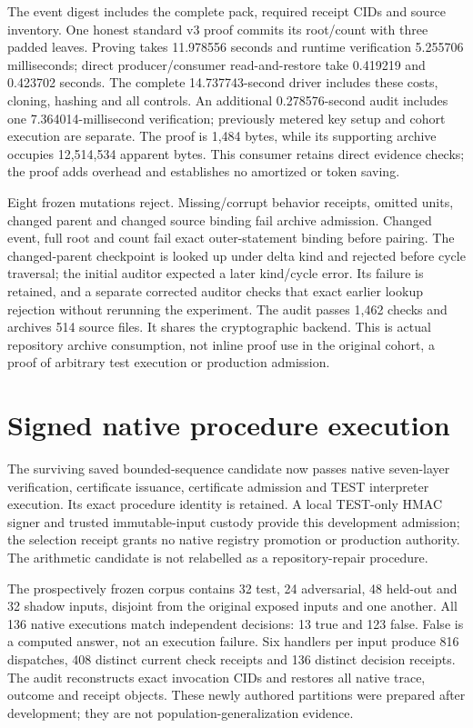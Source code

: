 The event digest includes the complete pack, required receipt CIDs and source
inventory. One honest standard v3 proof commits its root/count with three padded
leaves. Proving takes 11.978556 seconds and runtime verification 5.255706
milliseconds; direct producer/consumer read-and-restore take 0.419219 and
0.423702 seconds. The complete 14.737743-second driver includes these costs,
cloning, hashing and all controls. An additional 0.278576-second audit includes
one 7.364014-millisecond verification; previously metered key setup and cohort
execution are separate. The proof is 1,484 bytes, while its supporting archive
occupies 12,514,534 apparent bytes. This consumer retains direct evidence checks;
the proof adds overhead and establishes no amortized or token saving.

Eight frozen mutations reject. Missing/corrupt behavior receipts, omitted units,
changed parent and changed source binding fail archive admission. Changed event,
full root and count fail exact outer-statement binding before pairing. The
changed-parent checkpoint is looked up under delta kind and rejected before
cycle traversal; the initial auditor expected a later kind/cycle error. Its
failure is retained, and a separate corrected auditor checks that exact earlier
lookup rejection without rerunning the experiment. The audit passes 1,462
checks and archives 514 source files. It shares the cryptographic backend.
This is actual repository archive consumption, not inline proof use in the
original cohort, a proof of arbitrary test execution or production admission.

\section{Signed native procedure execution}
\label{sec:signed-native-procedure}
The surviving saved bounded-sequence candidate now passes native seven-layer
verification, certificate issuance, certificate admission and TEST interpreter
execution. Its exact procedure identity is retained. A local TEST-only HMAC
signer and trusted immutable-input custody provide this development admission;
the selection receipt grants no native registry promotion or production
authority. The arithmetic candidate is not relabelled as a repository-repair
procedure.

The prospectively frozen corpus contains 32 test, 24 adversarial, 48 held-out
and 32 shadow inputs, disjoint from the original exposed inputs and one another.
All 136 native executions match independent decisions: 13 true and 123 false.
False is a computed answer, not an execution failure. Six handlers per input
produce 816 dispatches, 408 distinct current check receipts and 136 distinct
decision receipts. The audit reconstructs exact invocation CIDs and restores
all native trace, outcome and receipt objects. These newly authored partitions
were prepared after development; they are not population-generalization evidence.

